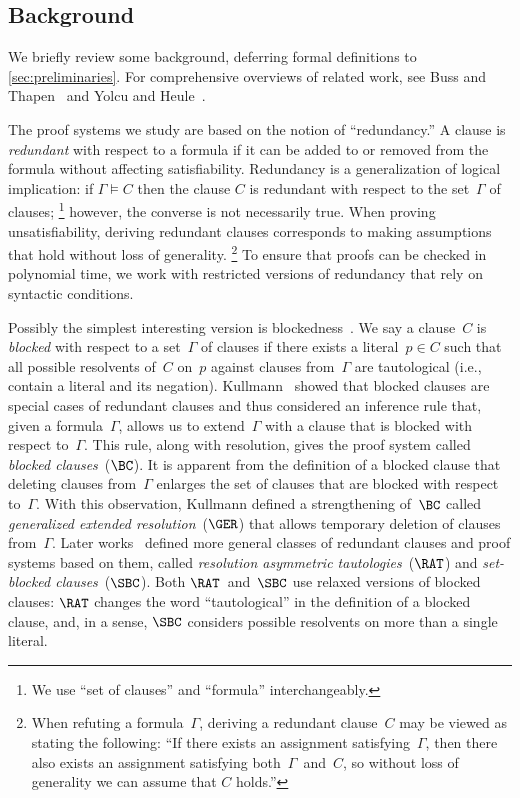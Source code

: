 \documentclass[10pt,a4paper]{article}
\begin{document}
\subsection{Background}
\label{sec:background}

We briefly review some background,
deferring formal definitions to \cref{sec:preliminaries}.
For comprehensive overviews of related work,
see Buss and Thapen~\cite{BT21} and Yolcu and Heule~\cite{YH23}.

The proof systems we study are based on the notion of ``redundancy.''
A clause is \emph{redundant} with respect to a formula
if it can be added to or removed from the formula
without affecting satisfiability.
Redundancy is a generalization of logical implication:
if $\Gamma \models C$ then the clause $C$
is redundant with respect to the set~$\Gamma$ of clauses;%
\footnote{We use ``set of clauses'' and ``formula'' interchangeably.}
however, the converse is not necessarily true.
When proving unsatisfiability,
deriving redundant clauses corresponds to
making assumptions that hold without loss of generality.%
\footnote{When refuting a formula~$\Gamma$,
  deriving a redundant clause~$C$ may be viewed as stating the following:
  ``If there exists an assignment satisfying~$\Gamma$,
  then there also exists an assignment satisfying both~$\Gamma$~and~$C$,
  so without loss of generality we can assume that $C$ holds.''}
To ensure that proofs can be checked in polynomial time,
we work with restricted versions of redundancy
that rely on syntactic conditions.

Possibly the simplest interesting version
is blockedness~\cite{Kul97,Kul99a}.
We say a clause~$C$ is \emph{blocked}
with respect to a set~$\Gamma$ of clauses
if there exists a literal~$p \in C$
such that all possible resolvents of~$C$ on~$p$
against clauses from~$\Gamma$ are tautological
(i.e., contain a literal and its negation).
Kullmann~\cite{Kul99b} showed that blocked clauses are
special cases of redundant clauses
and thus considered an inference rule that,
given a formula~$\Gamma$, allows us to extend~$\Gamma$
with a clause that is blocked with respect to~$\Gamma$.
This rule, along with resolution, gives
the proof system called \emph{blocked clauses}~($\BC$).
It is apparent from the definition of a blocked clause
that deleting clauses from~$\Gamma$ enlarges
the set of clauses that are blocked with respect to~$\Gamma$.
With this observation, Kullmann defined a strengthening of~$\BC$
called \emph{generalized extended resolution}~($\GER$)
that allows temporary deletion of clauses from~$\Gamma$.
Later works~\cite{JHB12,KSTB18} defined
more general classes of redundant clauses
and proof systems based on them,
called \emph{resolution asymmetric tautologies}~($\RAT$)
and \emph{set-blocked clauses}~($\SBC$).
Both $\RAT$~and~$\SBC$ use relaxed versions of blocked clauses:
$\RAT$ changes the word ``tautological'' in the definition of a blocked clause,
and, in a sense, $\SBC$ considers possible resolvents on more than a single literal.
\end{document}
